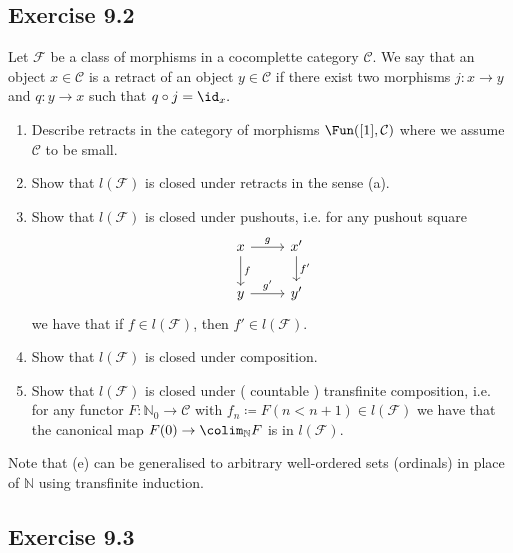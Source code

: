 \subsection{ Exercise 9.2 }

Let $ \mathcal{ F } $ be a class of morphisms in a cocomplette category $ \mathcal{ C } $.
We say that an object $ x \in \mathcal{ C } $ is a retract of an object $ y \in \mathcal{ C } $ if there exist two morphisms $ j : x \to y $ and $ q: y \to x $ such that $ q \circ j = \id_x .$

\begin{enumerate}[label=(\alph*)]
    \item 
    Describe retracts in the category of morphisms $ \Fun ( [ 1 ] , \mathcal{ C } ) $ where we assume $ \mathcal{ C } $ to be small.

    \item 
    Show that $ l ( \mathcal{ F } ) $ is closed under retracts in the sense (a).

    \item 
    Show that $ l ( \mathcal{ F } ) $ is closed under pushouts, i.e. for any pushout square
    \[
    \begin{tikzcd}
        x 
        \ar[r, "g"]
        \ar[d, "f"]
        &
        x'
        \ar[d,"f'"]
        \\
        y
        \ar[r, "g'"]
        &
        y'
    \end{tikzcd}
    \]
    we have that if $ f \in l ( \mathcal{ F } ) $, then $ f' \in l ( \mathcal{ F } ) $.

    \item 
    Show that $ l ( \mathcal{ F } )$ is closed under composition.

    \item 
    Show that $ l ( \mathcal{ F } ) $ is closed under ( countable ) transfinite composition, i.e. for any functor $ F : \mathbb{ N }_0 \to \mathcal{ C } $ with $ f_n \coloneqq F ( n < n + 1 ) \in l ( \mathcal{ F } ) $ we have that the canonical map $ F ( 0 ) \to \colim_{ \mathbb{ N } } F $ is in $ l ( \mathcal{ F } ) $.
\end{enumerate}

Note that (e) can be generalised to arbitrary well-ordered sets (ordinals) in place of $ \mathbb{ N } $ using transfinite induction.

\subsection{ Exercise 9.3 }

